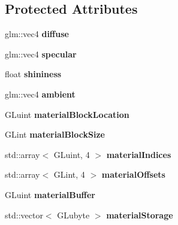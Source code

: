 \subsection*{Protected Attributes}
\begin{DoxyCompactItemize}
\item 
\hypertarget{class_blinn_phong_shader_ae74d0446ec1a871ca57caf002f52e20c}{}glm\+::vec4 {\bfseries diffuse}\label{class_blinn_phong_shader_ae74d0446ec1a871ca57caf002f52e20c}

\item 
\hypertarget{class_blinn_phong_shader_a7adce7364e850b9f232e058956f809b8}{}glm\+::vec4 {\bfseries specular}\label{class_blinn_phong_shader_a7adce7364e850b9f232e058956f809b8}

\item 
\hypertarget{class_blinn_phong_shader_ad499c2389d7007ecb4c03d5270314933}{}float {\bfseries shininess}\label{class_blinn_phong_shader_ad499c2389d7007ecb4c03d5270314933}

\item 
\hypertarget{class_blinn_phong_shader_af612b03df22b2bc9e37dcd85124ee9d2}{}glm\+::vec4 {\bfseries ambient}\label{class_blinn_phong_shader_af612b03df22b2bc9e37dcd85124ee9d2}

\item 
\hypertarget{class_blinn_phong_shader_a4dcd123c2284945734df697501dca5ea}{}G\+Luint {\bfseries material\+Block\+Location}\label{class_blinn_phong_shader_a4dcd123c2284945734df697501dca5ea}

\item 
\hypertarget{class_blinn_phong_shader_af38b3d042773f6568f0f6c227de85990}{}G\+Lint {\bfseries material\+Block\+Size}\label{class_blinn_phong_shader_af38b3d042773f6568f0f6c227de85990}

\item 
\hypertarget{class_blinn_phong_shader_a2b14622a5d0f8ca32c05cc387700692a}{}std\+::array$<$ G\+Luint, 4 $>$ {\bfseries material\+Indices}\label{class_blinn_phong_shader_a2b14622a5d0f8ca32c05cc387700692a}

\item 
\hypertarget{class_blinn_phong_shader_a145f22608d6e32a4ec5df39388ad0530}{}std\+::array$<$ G\+Lint, 4 $>$ {\bfseries material\+Offsets}\label{class_blinn_phong_shader_a145f22608d6e32a4ec5df39388ad0530}

\item 
\hypertarget{class_blinn_phong_shader_a85dbf4a8376a98570a06d9df17938cf4}{}G\+Luint {\bfseries material\+Buffer}\label{class_blinn_phong_shader_a85dbf4a8376a98570a06d9df17938cf4}

\item 
\hypertarget{class_blinn_phong_shader_a7c9644732d35c788d1c94f44b7783d83}{}std\+::vector$<$ G\+Lubyte $>$ {\bfseries material\+Storage}\label{class_blinn_phong_shader_a7c9644732d35c788d1c94f44b7783d83}

\end{DoxyCompactItemize}
